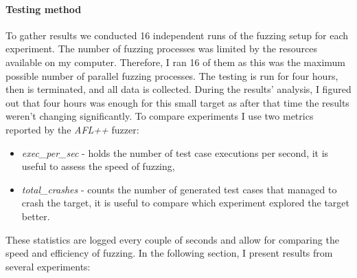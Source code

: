 \paragraph{Testing method}
To gather results we conducted 16 independent runs of the fuzzing setup for each experiment. The number of fuzzing processes was limited by the resources available on my computer. Therefore, I ran 16 of them as this was the maximum possible number of parallel fuzzing processes. The testing is run for four hours, then is terminated, and all data is collected. During the results' analysis, I figured out that four hours was enough for this small target as after that time the results weren't changing significantly. 
To compare experiments I use two metrics reported by the \textit{AFL++} fuzzer:
\begin{itemize}
    \item \textit{exec\_per\_sec} - holds the number of test case executions per second, it is useful to assess the speed of fuzzing,
    \item \textit{total\_crashes} - counts the number of generated test cases that managed to crash the target, it is useful to compare which experiment explored the target better.
\end{itemize}
These statistics are logged every couple of seconds and allow for comparing the speed and efficiency of fuzzing.
In the following section, I present results from several experiments:
